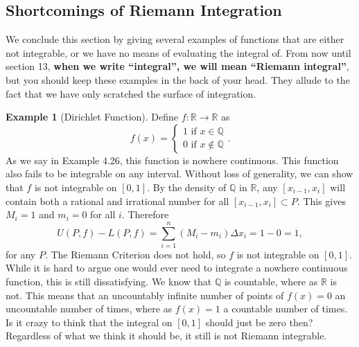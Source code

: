 \documentclass{article}
\newcommand{\R}{\mathbb{R}}
\newcommand{\Q}{\mathbb{Q}}
\theoremstyle{definition}
\newtheorem{example}{Example}[section]
\begin{document}
	\subsection{Shortcomings of Riemann Integration}
	We conclude this section by giving several examples of functions that are either not integrable, or we have no means of evaluating the integral of. From now until section 13,\textbf{ when we write ``integral'', we will mean ``Riemann integral''}, but you should keep these examples in the back of your head. They allude to the fact that we have only scratched the surface of integration.
	\begin{example}[Dirichlet Function]
		Define $ f:\R\to\R $ as $$f(x)=\begin{cases}
			1\text{ if }x\in\Q\\0\text{ if }x\notin\Q
		\end{cases} .$$ As we say in Example 4.26, this function is nowhere continuous. This function also fails to be integrable on any interval. Without loss of generality, we can show that $ f $ is not integrable on $ [0,1] $. By the density of $ \Q $ in $ \R $, any $ [x_{i-1},x_i] $ will contain both a rational and irrational number for all $ [x_{i-1},x_i]\subset P $. This gives $ M_i=1 $ and $ m_i=0 $ for all $ i $. Therefore $$U(P,f)-L(P,f)=\sum_{i=1}^{n}(M_i-m_i)\Delta x_i=1-0=1 ,$$ for any $ P $. The Riemann Criterion does not hold, so $ f $ is not integrable on $ [0,1] $. While it is hard to argue one would ever need to integrate a nowhere continuous function, this is still dissatisfying. We know that $ \Q $ is countable, where as $ \R $ is not. This means that an uncountably infinite number of points of $ f(x)=0 $ an uncountable number of times, where as $ f(x)=1 $ a countable number of times. Is it crazy to think that the integral on $ [0,1]$ should just be zero then? Regardless of what we think it should be, it still is not Riemann integrable.
	\end{example}
	
\end{document}
